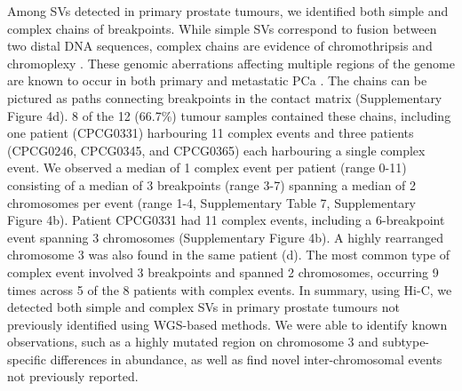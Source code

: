 
Among SVs detected in primary prostate tumours, we identified both simple and complex chains of breakpoints.
While simple SVs correspond to fusion between two distal DNA sequences, complex chains are evidence of chromothripsis and chromoplexy \cite{bacaPunctuatedEvolutionProstate2013}.
These genomic aberrations affecting multiple regions of the genome are known to occur in both primary and metastatic PCa \cite{bacaPunctuatedEvolutionProstate2013,fraserGenomicHallmarksLocalized2017,liPatternsSomaticStructural2020}.
The chains can be pictured as paths connecting breakpoints in the contact matrix (Supplementary Figure 4d).
8 of the 12 (66.7\%) tumour samples contained these chains, including one patient (CPCG0331) harbouring 11 complex events and three patients (CPCG0246, CPCG0345, and CPCG0365) each harbouring a single complex event.
We observed a median of 1 complex event per patient (range 0-11) consisting of a median of 3 breakpoints (range 3-7) spanning a median of 2 chromosomes per event (range 1-4, Supplementary Table 7, Supplementary Figure 4b).
Patient CPCG0331 had 11 complex events, including a 6-breakpoint event spanning 3 chromosomes (Supplementary Figure 4b).
A highly rearranged chromosome 3 was also found in the same patient (d).
The most common type of complex event involved 3 breakpoints and spanned 2 chromosomes, occurring 9 times across 5 of the 8 patients with complex events.
In summary, using Hi-C, we detected both simple and complex SVs in primary prostate tumours not previously identified using WGS-based methods.
We were able to identify known observations, such as a highly mutated region on chromosome 3 and subtype-specific differences in abundance, as well as find novel inter-chromosomal events not previously reported.

